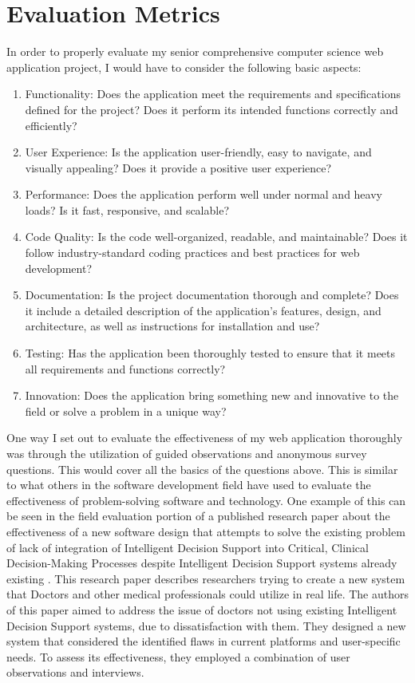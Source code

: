 \documentclass[10pt,twocolumn]{article}
\begin{document}
\section{Evaluation Metrics}

In order to properly evaluate my senior comprehensive computer science web application project, I would have to consider the following basic aspects:

\begin{enumerate}
    \item Functionality: Does the application meet the requirements and specifications defined for the project? Does it perform its intended functions correctly and efficiently?
    \item User Experience: Is the application user-friendly, easy to navigate, and visually appealing? Does it provide a positive user experience?
    \item Performance: Does the application perform well under normal and heavy loads? Is it fast, responsive, and scalable?
    \item Code Quality: Is the code well-organized, readable, and maintainable? Does it follow industry-standard coding practices and best practices for web development?
    \item Documentation: Is the project documentation thorough and complete? Does it include a detailed description of the application's features, design, and architecture, as well as instructions for installation and use?
    \item Testing: Has the application been thoroughly tested to ensure that it meets all requirements and functions correctly?
    \item Innovation: Does the application bring something new and innovative to the field or solve a problem in a unique way?
\end{enumerate}

One way I set out to evaluate the effectiveness of my web application thoroughly was through the utilization of guided observations and anonymous survey questions. This would cover all the basics of the questions above. This is similar to what others in the software development field have used to evaluate the effectiveness of problem-solving software and technology. One example of this can be seen in the field evaluation portion of a published research paper about the effectiveness of a new software design that attempts to solve the existing problem of lack of integration of  Intelligent Decision Support into Critical, Clinical Decision-Making Processes despite Intelligent Decision Support systems already existing \cite{unremarkableAI}. This research paper describes researchers trying to create a new system that Doctors and other medical professionals could utilize in real life. The authors of this paper aimed to address the issue of doctors not using existing Intelligent Decision Support systems, due to dissatisfaction with them. They designed a new system that considered the identified flaws in current platforms and user-specific needs. To assess its effectiveness, they employed a combination of user observations and interviews.
\end{document}
